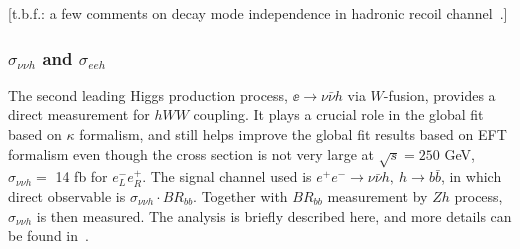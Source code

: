 [t.b.f.: a few comments on decay mode independence in hadronic recoil channel~\cite{}.]

\subsubsection{$\sigma_{\nu\nu h}$ and $\sigma_{eeh}$}
\label{subsubsec:higgs:nunuee}

The second leading Higgs production process, 
$\ee\to\nu\bar{\nu}h$ via $W$-fusion, provides a direct measurement
for $hWW$ coupling. It plays a crucial role in the global fit based on $\kappa$ formalism,
and still helps improve the global fit results based on EFT formalism even though 
the cross section is not very large at $\sqrt{s}=250$ GeV, 
$\sigma_{\nu\nu h}=$ 14 fb for $e^-_Le^+_R$. 
The signal channel used is 
$e^+e^-\to\nu\bar{\nu}h,~h\to b\bar{b}$, in which direct observable is
$\sigma_{\nu\nu h}\cdot BR_{bb}$. Together with $BR_{bb}$ measurement
by $Zh$ process, $\sigma_{\nu\nu h}$ is then measured.
The analysis is briefly described here, and more details can be found 
in~\cite{Durig:2014lfa,Tian:2017}. 

